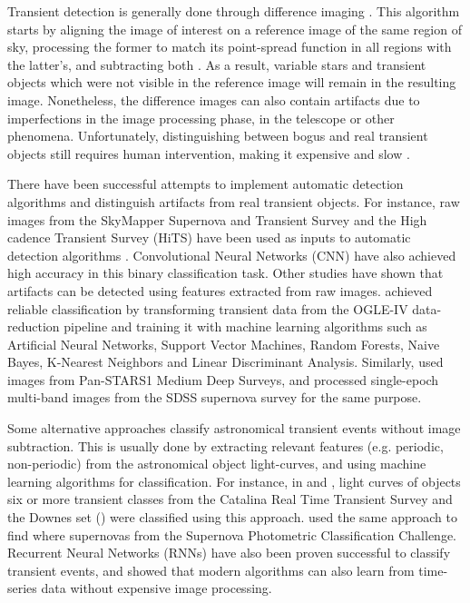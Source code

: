 \documentclass[a4paper,fleqn,usenatbib]{mnras}
\begin{document}
Transient detection is generally done through 
difference imaging \citep{1507.05137,1608.01733,1708.02850}. 
This algorithm starts by aligning the image of interest on a reference image of the
same region of sky, processing the former to match its point-spread
function in all regions with the latter's, and subtracting both
\citep{astro-ph/9712287}. 
As a result, variable stars and transient objects which were not
visible in the reference image will remain in the resulting
image. 
Nonetheless, the difference images can also contain
artifacts due to imperfections in the image processing
phase, in the telescope or other phenomena. 
Unfortunately, distinguishing between bogus and real transient objects
still requires human intervention, making it expensive and slow
\citep{2011arXiv1110.4655D}.  


There have been successful attempts to implement automatic detection
algorithms and distinguish artifacts from real transient
objects.  
For instance, raw images from the  SkyMapper Supernova and Transient
Survey and the High cadence Transient Survey (HiTS) have been used as
inputs to automatic detection algorithms \citep{1708.08947,1701.00458}.
Convolutional Neural Networks (CNN) have also achieved
high accuracy in this binary classification task.
Other studies have shown that artifacts can be detected using
features extracted from raw images. 
\cite{1601.06320} achieved reliable
classification by transforming transient data from the OGLE-IV
data-reduction pipeline and training it with machine learning
algorithms such as Artificial Neural Networks, Support Vector
Machines, Random Forests, Naive Bayes, K-Nearest Neighbors and Linear
Discriminant Analysis.  
Similarly, \cite{1501.05470} used images from Pan-STARS1 Medium Deep
Surveys, and \cite{1407.4118} processed single-epoch multi-band images
from the SDSS supernova survey for the same purpose.  



Some alternative approaches classify astronomical transient
events without image subtraction.
This is usually done by extracting relevant features (e.g. periodic,
non-periodic) from the astronomical object light-curves, and using
machine learning algorithms for classification. 
For instance, in \cite{1401.3211} and \cite{1601.03931}, light curves
of objects six or more transient classes from the Catalina Real Time
Transient Survey and the Downes set (\cite{d05}) were
classified using this approach.
\cite{1603.00882} used the same approach to find
where supernovas from the Supernova Photometric Classification
Challenge.
Recurrent Neural Networks (RNNs) have also been proven successful to
classify transient events, \cite{1606.07442} and \cite{1710.06804}
showed that  modern algorithms can also learn from time-series data
without expensive image processing.    
\end{document}
